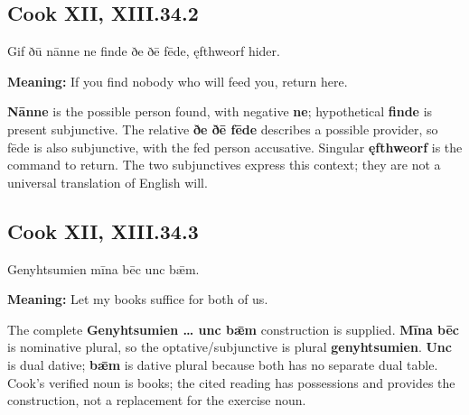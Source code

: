 \par\begin{minipage}{\linewidth}\raggedright
\subsection*{Cook XII, XIII.34.2}

Gif ðū nānne ne finde ðe ðē fēde, ęfthweorf hider.

\textbf{Meaning:} If you find nobody who will feed you, return here.

\textbf{Nānne} is the possible person found, with negative \textbf{ne}; hypothetical \textbf{finde} is present subjunctive. The relative \textbf{ðe ðē fēde} describes a possible provider, so fēde is also subjunctive, with the fed person accusative. Singular \textbf{ęfthweorf} is the command to return. The two subjunctives express this context; they are not a universal translation of English will.

\end{minipage}\par\addvspace{4pt}

\par\begin{minipage}{\linewidth}\raggedright
\subsection*{Cook XII, XIII.34.3}

Genyhtsumien mīna bēc unc bǣm.

\textbf{Meaning:} Let my books suffice for both of us.

The complete \textbf{Genyhtsumien … unc bǣm} construction is supplied. \textbf{Mīna bēc} is nominative plural, so the optative/\allowbreak{}subjunctive is plural \textbf{genyhtsumien}. \textbf{Unc} is dual dative; \textbf{bǣm} is dative plural because both has no separate dual table. Cook’s verified noun is books; the cited reading has possessions and provides the construction, not a replacement for the exercise noun.

\end{minipage}\par\addvspace{4pt}


